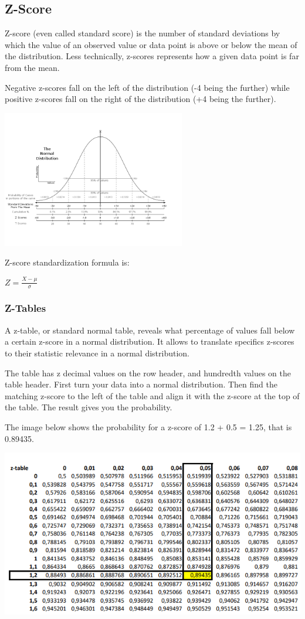 \documentclass{article}
\begin{document}
\subsection{Z-Score}
Z-score (even called standard score) is the number of standard deviations by which the value of an observed value or data point is above or below the mean of the distribution. Less technically, z-scores represents how a given data point is far from the mean.

Negative z-scores fall on the left of the distribution (-4 being the further) while positive z-scores fall on the right of the distribution (+4 being the further).

\includegraphics[width=8cm, height=6cm]{normal_distribution}

Z-score standardization formula is:

$\displaystyle Z={\frac {X-\mu }{\sigma }}$

\subsubsection{Z-Tables}
A z-table, or standard normal table, reveals what percentage of values fall below a certain z-score in a normal distribution. It allows to translate specifics z-scores to their statistic relevance in a normal distribution.

The table has z decimal values on the row header, and hundredth values on the table header. First turn your data into a normal distribution. Then find the matching z-score to the left of the table and align it with the z-score at the top of the table. The result gives you the probability. 

The image below shows the probability for a z-score of 1.2 + 0.5 = 1.25, that is 0.89435.

\includegraphics{z-table}
\end{document}

